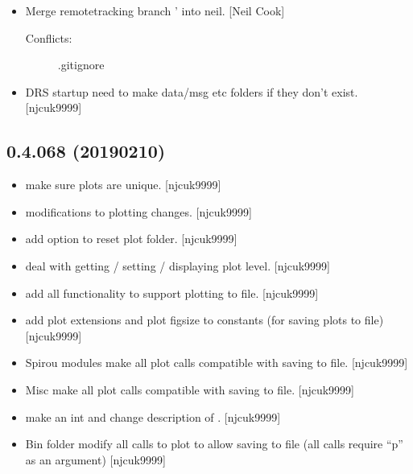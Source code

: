 \documentclass[a4paper,10pt,english]{report}
\begin{document}
\begin{itemize}
\begin{description}
\end{description}

\item {} 
Merge remote\sphinxhyphen{}tracking branch ’ into neil. {[}Neil
Cook{]}
\begin{description}
\item[{Conflicts:}] \leavevmode
.gitignore

\end{description}

\item {} 
DRS startup \sphinxhyphen{} need to make data/msg etc folders if they don’t exist.
{[}njcuk9999{]}

\end{itemize}


\subsection{0.4.068 (2019\sphinxhyphen{}02\sphinxhyphen{}10)}
\label{\detokenize{misc/changelog:id209}}\begin{itemize}
\item {} 
 \sphinxhyphen{} make sure plots are unique. {[}njcuk9999{]}

\item {} 
 \sphinxhyphen{} modifications to plotting changes.
{[}njcuk9999{]}

\item {} 
 \sphinxhyphen{} add option to reset plot folder. {[}njcuk9999{]}

\item {} 
 \sphinxhyphen{} deal with getting / setting / displaying plot
level. {[}njcuk9999{]}

\item {} 
 \sphinxhyphen{} add all functionality to support plotting to file.
{[}njcuk9999{]}

\item {} 
 \sphinxhyphen{} add plot extensions and plot figsize to constants
(for saving plots to file) {[}njcuk9999{]}

\item {} 
Spirou modules \sphinxhyphen{} make all plot calls compatible with saving to file.
{[}njcuk9999{]}

\item {} 
Misc \sphinxhyphen{} make all plot calls compatible with saving to file. {[}njcuk9999{]}

\item {} 
 \sphinxhyphen{} make  an int and change description of
. {[}njcuk9999{]}

\item {} 
Bin folder \sphinxhyphen{} modify all calls to plot to allow saving to file (all
calls require “p” as an argument) {[}njcuk9999{]}

\end{itemize}
\end{document}
